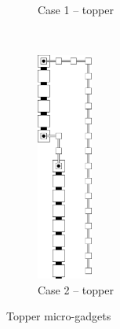 \begin{figure}[H]
\begin{subfigure}[t]{0.2\textwidth}
        \caption{\label{fig:topper_case1} Case 1 -- topper}
    \end{subfigure}%
    ~
    \begin{subfigure}[t]{0.2\textwidth}
        \centering
        \includegraphics[width=0.2\textwidth]{digit_top_case2_digit2_topper}
        \caption{\label{fig:topper_case2} Case 2 -- topper}
    \end{subfigure}%
    \caption{\label{fig:topper_microgadgets} Topper micro-gadgets }
\end{figure}


